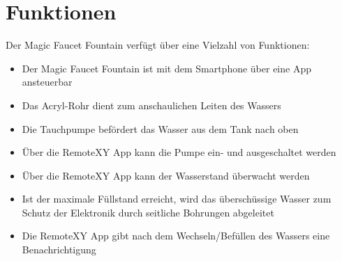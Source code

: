 %
%
%

\chapter{Funktionen}
Der Magic Faucet Fountain verfügt über eine Vielzahl von Funktionen:
\begin{itemize}
	\item Der Magic Faucet Fountain ist mit dem Smartphone über eine App ansteuerbar
	\item Das Acryl-Rohr dient zum anschaulichen Leiten des Wassers
	\item Die Tauchpumpe befördert das Wasser aus dem Tank nach oben
	\item Über die RemoteXY App kann die Pumpe ein- und ausgeschaltet werden 
	\item Über die RemoteXY App kann der Wasserstand überwacht werden 
	\item Ist der maximale Füllstand erreicht, wird das überschüssige Wasser zum Schutz der Elektronik durch seitliche Bohrungen abgeleitet
	\item Die RemoteXY App gibt nach dem Wechseln/Befüllen des Wassers eine Benachrichtigung
\end{itemize}

